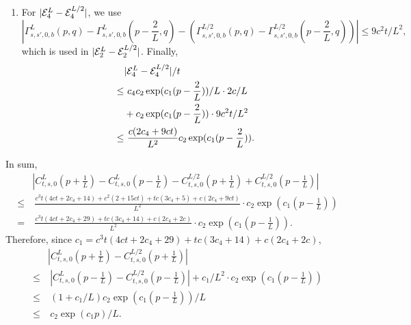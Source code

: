 \documentclass{article}
\theoremstyle{plain}
\theoremstyle{definition}
\begin{document}
\begin{enumerate}
    \[\tilde\cE_3^L=\frac2L\sum_{s'=0}^s C_{t,s',0}^{L}(p)\Gamma_{s,s',0,0}^{L}(p,p).\]
    Then we can bound
    \begin{align*}
        & |\cE_3^L-\cE_3^{L/2}|\\
        \leq &~ |\cE_3^L-\tilde\cE_3^{L}|+|\tilde\cE_3^L-\cE_3^{L/2}|\\
        \leq &~ \frac tL (c_4c_2\exp(c_1(p-\frac2L))/L \cdot c + c_2\exp(c_1(p-\frac2L)) \cdot c/L)\\
        & + \frac{2t}L (c_5c_2\exp(c_1(p-\frac1L))/L c + c_2\exp(c_1(p-\frac1L)) \cdot c/L)\\
        \leq &~ \frac{tc(c_4+1+2c_5+2)}{L^2}c_2\exp(c_1(p-\frac1L)).
    \end{align*}
    \item For $|\mathcal{E}_4^L-\mathcal{E}_4^{L/2}|$, we use \[|\Gamma^L_{s,s',0,b}(p,q) - \Gamma^L_{s,s',0,b}(p-\frac2L,q) - (\Gamma^{L/2}_{s,s',0,b}(p,q) - \Gamma^{L/2}_{s,s',0,b}(p-\frac2L,q))|        \leq 9c^2t/L^2,\] which is used in $|\mathcal{E}_2^L-\mathcal{E}_2^{L/2}|$. Finally,
    \begin{align*}
        & |\mathcal{E}_4^L-\mathcal{E}_4^{L/2}| / t\\
        \leq &~ c_4c_2\exp(c_1(p-\frac2L))/L\cdot 2c/L\\
        & + c_2\exp(c_1(p-\frac2L)) \cdot 9c^2t/L^2\\
        \leq &~ \frac{c(2c_4+9ct)}{L^2} c_2 \exp(c_1(p-\frac2L)).
    \end{align*}
\end{enumerate}

In sum, 
\begin{align*}
    & |C^L_{t,s,0}(p+\frac1L) - C^L_{t,s,0}(p-\frac1L) -C^{L/2}_{t,s,0}(p+\frac1L) + C^{L/2}_{t,s,0}(p-\frac1L)| \\
    \leq &~ \frac{c^3t(4ct+2c_4+14) + c^2(2+15ct) + tc(3c_4+5)+c(2c_4+9ct)}{L^2}\cdot c_2 \exp(c_1(p-\frac1L))\\
    = &~ \frac{c^3t(4ct+2c_4+29) + tc(3c_4+14)+c(2c_4+2c)}{L^2}\cdot c_2 \exp(c_1(p-\frac1L)).
\end{align*}
Therefore, since $c_1= c^3t(4ct+2c_4+29) + tc(3c_4+14)+c(2c_4+2c)$,
\begin{align*}
    & |C^L_{t,s,0}(p+\frac1L) -C^{L/2}_{t,s,0}(p+\frac1L)| \\
    \leq &~ |C^L_{t,s,0}(p-\frac1L) - C^{L/2}_{t,s,0}(p-\frac1L)| + c_1 / L^2 \cdot c_2 \exp(c_1(p-\frac1L))\\
    \leq&~ (1+c_1/L)c_2 \exp(c_1(p-\frac1L)) /L\\
    \leq&~ c_2\exp(c_1p)/L.
\end{align*}
\end{document}
